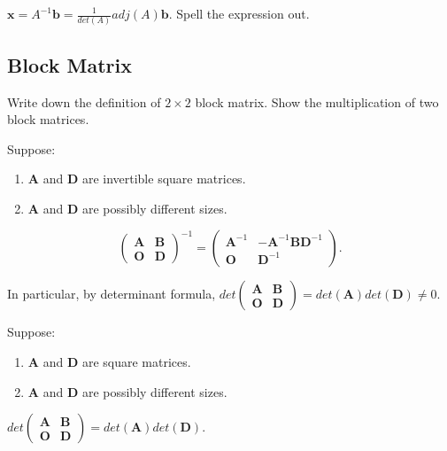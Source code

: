 \documentclass[12pt]{article}
\begin{document}
\begin{pf}
    $\mathbf{x}=A^{-1}\mathbf{b}=\frac{1}{det(A)}adj(A)\mathbf{b}$. Spell the expression out.
\end{pf}


\subsection*{Block Matrix}
\begin{exercise}
    Write down the definition of $2\times 2$ block matrix.
    Show the multiplication of two block matrices.
\end{exercise}

\begin{theorem}
    Suppose:
    \begin{enumerate}
        \item $\textbf{A}$ and $\textbf{D}$ are invertible square matrices.
        \item $\textbf{A}$ and $\textbf{D}$ are possibly different sizes.
    \end{enumerate}
\[
\begin{pmatrix}
\mathbf{A} & \mathbf{B}\\
\mathbf{O} & \mathbf{D}
\end{pmatrix}^{-1}
=
\begin{pmatrix}
\mathbf{A}^{-1} & -\mathbf{A}^{-1}\mathbf{B}\mathbf{D}^{-1}\\
\mathbf{O} & \mathbf{D}^{-1}
\end{pmatrix}.
\]

In particular, by determinant formula, 
$det\begin{pmatrix}
\mathbf{A} & \mathbf{B}\\
\mathbf{O} & \mathbf{D}
\end{pmatrix} = det(\mathbf{A})det(\mathbf{D})\neq 0. $
\end{theorem}

\begin{theorem}
    Suppose:
    \begin{enumerate}
        \item $\textbf{A}$ and $\textbf{D}$ are square matrices.
        \item $\textbf{A}$ and $\textbf{D}$ are possibly different sizes.
    \end{enumerate}

$det\begin{pmatrix}
\mathbf{A} & \mathbf{B}\\
\mathbf{O} & \mathbf{D}
\end{pmatrix} = det(\mathbf{A})det(\mathbf{D})$.

\end{theorem}
\end{document}
